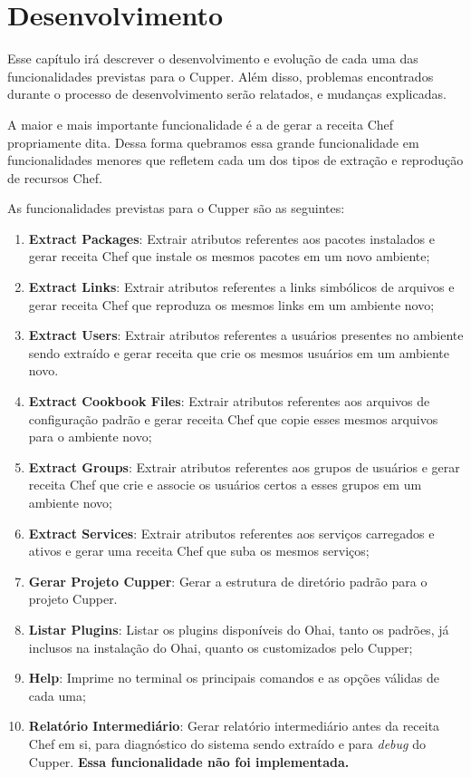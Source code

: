\chapter{Desenvolvimento}
\label{chap:dev}

Esse capítulo irá descrever o desenvolvimento e evolução de cada uma das funcionalidades
previstas para o Cupper. Além disso, problemas encontrados durante o processo
de desenvolvimento serão relatados, e mudanças explicadas.

A maior e mais importante funcionalidade é a de gerar a receita Chef propriamente dita.
Dessa forma quebramos essa grande funcionalidade em funcionalidades menores que refletem cada
um dos tipos de extração e reprodução de recursos Chef.

As funcionalidades previstas para o Cupper são as seguintes:

\begin{enumerate}
  \item \textbf{Extract Packages}: Extrair atributos referentes aos pacotes
instalados e gerar receita Chef que instale os mesmos pacotes em um novo ambiente;
  \item \textbf{Extract Links}: Extrair atributos referentes a links simbólicos
de arquivos e gerar receita Chef que reproduza os mesmos links em um ambiente novo;
  \item \textbf{Extract Users}: Extrair atributos referentes a usuários presentes
no ambiente sendo extraído e gerar receita que crie os mesmos usuários em um
ambiente novo.
  \item \textbf{Extract Cookbook Files}: Extrair atributos referentes aos arquivos
de configuração padrão e gerar receita Chef que copie esses mesmos arquivos para o ambiente novo;
  \item \textbf{Extract Groups}: Extrair atributos referentes aos grupos de usuários
e gerar receita Chef que crie e associe os usuários certos a esses grupos em um
ambiente novo;
  \item \textbf{Extract Services}: Extrair atributos referentes aos serviços carregados
e ativos e gerar uma receita Chef que suba os mesmos serviços;
  \item \textbf{Gerar Projeto Cupper}: Gerar a estrutura de diretório padrão 
para o projeto Cupper.
  \item \textbf{Listar Plugins}: Listar os plugins disponíveis do Ohai, tanto 
os padrões, já inclusos na instalação do Ohai, quanto os customizados pelo Cupper;
  \item \textbf{Help}: Imprime no terminal os principais comandos e as opções
válidas de cada uma;
  \item \textbf{Relatório Intermediário}: Gerar relatório intermediário antes
    da receita Chef em si, para diagnóstico do sistema sendo extraído e para \textit{debug}
do Cupper. \textbf{Essa funcionalidade não foi implementada.}

\end{enumerate}


